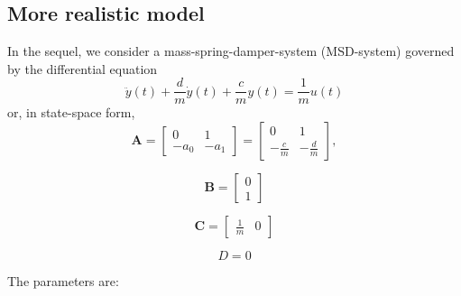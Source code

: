 \documentclass[11pt,a4paper, d]{scrartcl}
\makeatletter
\newcommand{\boxspacing}{\kern\kvtcb@left@rule\kern\kvtcb@boxsep}
\newcommand{\prompt}[4]{
        {\ttfamily\llap{{\color{#2}[#3]:\hspace{3pt}#4}}\vspace{-\baselineskip}}
    }
\makeatother
\begin{document}
    \begin{tcolorbox}[breakable, size=fbox, boxrule=1pt, pad at break*=1mm,colback=cellbackground, colframe=cellborder]
\prompt{In}{incolor}{ }{\boxspacing}
\begin{Verbatim}[commandchars=\\\{\}]

\end{Verbatim}
\end{tcolorbox}

    \hypertarget{more-realistic-model}{%
\subsection{More realistic model}\label{more-realistic-model}}

In the sequel, we consider a mass-spring-damper-system (MSD-system)
governed by the differential equation \begin{equation}
\ddot{y}(t) + \frac{d}{m}\dot{y}(t) + \frac{c}{m}y(t) = \frac{1}{m}u(t)
\end{equation} or, in state-space form, \begin{equation}
\mathbf{A} = \begin{bmatrix}%
             0 & 1\\
            -a_{0} & -a_{1}   
            \end{bmatrix}
            = \begin{bmatrix}%
             0 & 1\\
            -\frac{c}{m} & -\frac{d}{m}   
            \end{bmatrix},
\end{equation}

\begin{equation}
\mathbf{B} = \begin{bmatrix} 0 \\ 1\end{bmatrix} 
\end{equation}

\begin{equation}
\mathbf{C} = \begin{bmatrix} \frac{1}{m} & 0\end{bmatrix}
\end{equation}

\begin{equation*}
D = 0
\end{equation*}

The parameters are:
\end{document}
